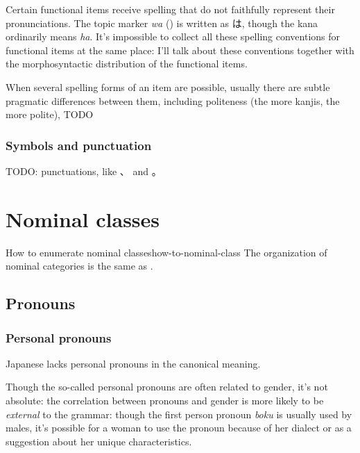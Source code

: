 \documentclass[UTF8, a4paper, oneside, scheme=plain]{ctexrep}
\newcommand*{\citechap}[1]{chap.~{#1}}
\newcommand{\corpus}[1]{\emph{#1}}
\begin{document}
Certain functional items receive spelling that do not faithfully represent their pronunciations.
The topic marker \corpus{wa} () is written as は,
though the kana ordinarily means \corpus{ha}.
It's impossible to collect all these spelling conventions for functional items at the same place:
I'll talk about these conventions together with the morphosyntactic distribution of the functional items.

When several spelling forms of an item are possible,
usually there are subtle pragmatic differences between them,
including politeness (the more kanjis, the more polite), TODO

\subsection{Symbols and punctuation}\label{sec:writing-symbols}



TODO: punctuations, like 、 and 。

\chapter{Nominal classes}

\begin{theorybox}{How to enumerate nominal classes}{how-to-nominal-class}
    The organization of nominal categories is the same as \citet[\citechap{3}, \citechap{4}]{Friesen2017}.
\end{theorybox}

\section{Pronouns}

\subsection{Personal pronouns}\label{sec:personal-pronoun}

Japanese lacks personal pronouns in the canonical meaning.

Though the so-called personal pronouns are often related to gender, 
it's not absolute: 
the correlation between pronouns and gender is more likely 
to be \emph{external} to the grammar:
though the first person pronoun \corpus{boku} is usually used by males,
it's possible for a woman to use the pronoun 
because of her dialect or
as a suggestion about her unique characteristics.
\end{document}
